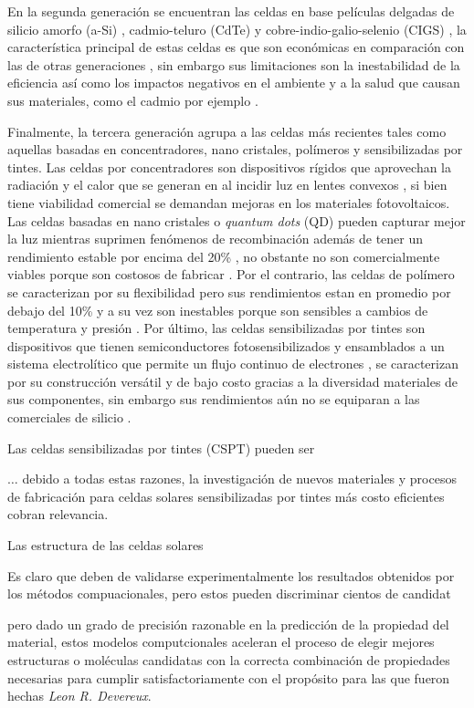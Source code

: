 En la segunda generación se encuentran las celdas en base películas delgadas de silicio amorfo (a-Si) \cite{kaur2016review}, cadmio-teluro (CdTe) \cite{bertolli2008} y cobre-indio-galio-selenio (CIGS) \cite{bagher2015types}, la característica principal de estas celdas es que son económicas en comparación con las de otras generaciones \cite{rathore2021}, sin embargo sus limitaciones son la inestabilidad de la eficiencia \cite{gul2016review} así como los impactos negativos en el ambiente y a la salud que causan sus materiales, como el cadmio por ejemplo \cite{bagher2015types}. 

Finalmente, la tercera generación agrupa a las celdas más recientes tales como aquellas basadas en concentradores, nano cristales, polímeros y sensibilizadas por tintes. Las celdas por concentradores son dispositivos rígidos que aprovechan la radiación y el calor que se generan en al incidir luz en lentes convexos \cite{bertolli2008}, si bien tiene viabilidad comercial se demandan mejoras en los materiales fotovoltaicos. Las celdas basadas en nano cristales o \textit{quantum dots} (QD) pueden capturar mejor la luz mientras suprimen fenómenos de recombinación además de tener un rendimiento estable por encima del 20\% \cite{kim2022conformal}, no obstante no son comercialmente viables porque son costosos de fabricar \cite{jean2018synthesis}. Por el contrario, las celdas de polímero se caracterizan por su flexibilidad pero sus rendimientos estan en promedio por debajo del 10\% y a su vez son inestables porque son sensibles a cambios de temperatura y presión \cite{gusain2019polymer}. Por último, las celdas sensibilizadas por tintes son dispositivos que tienen semiconductores fotosensibilizados y ensamblados a un sistema electrolítico que permite un flujo continuo de electrones \cite{suhaimi2015materials}, se caracterizan por su construcción versátil y de bajo costo gracias a la diversidad materiales de sus componentes, sin embargo sus rendimientos aún no se equiparan a las comerciales de silicio \cite{sharma2018dye}. 


Las celdas sensibilizadas por tintes (CSPT) pueden ser 

$\dots$ debido a todas estas razones, la investigación de nuevos materiales y procesos de fabricación para celdas solares sensibilizadas por tintes más costo eficientes cobran relevancia. 


Las estructura de las celdas solares 


Es claro que deben de validarse experimentalmente los resultados obtenidos por los métodos compuacionales, pero estos pueden discriminar cientos de candidat


pero dado un grado de precisión razonable  en la predicción de la propiedad del material, estos modelos computcionales aceleran el proceso de elegir mejores estructuras o moléculas candidatas con la correcta combinación de propiedades necesarias para cumplir satisfactoriamente con el propósito para las que fueron hechas \textit{Leon R. Devereux}. 



